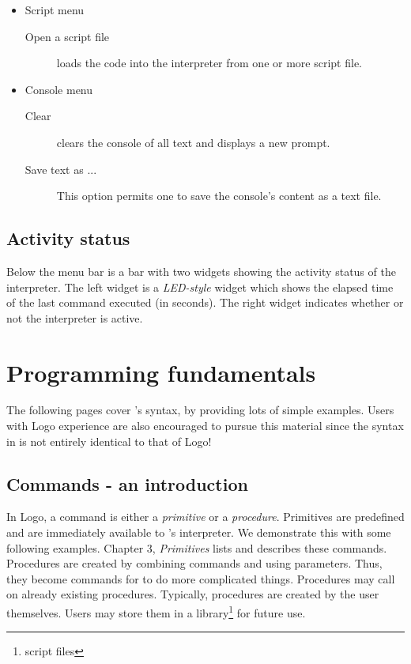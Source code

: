\begin{itemize}
\item Script menu

\begin{description}
\item[Open a script file] loads the code into the interpreter from one or more \squirrel script file.
\end{description}

\item Console menu

\begin{description}
\item[Clear] clears the console of all text and displays a new prompt.
\item[Save text as ...] This option permits one to save the console's content as a text file.
\end{description}
\end{itemize}

\subsection{Activity status}

Below the menu bar is a bar with two widgets showing the activity status of the interpreter. The left widget is a {\em LED-style} widget which shows the elapsed time of the last command executed (in seconds).  The right widget indicates whether or not the interpreter is active.

\section{Programming fundamentals} 

The following pages cover \squirrel's syntax, by providing lots of simple examples.  Users with Logo experience are also encouraged to pursue this material since the syntax in \squirrel is not entirely identical to that of Logo!
  
\subsection{Commands - an introduction} 

In Logo, a command is either a {\em primitive} or a {\em procedure}.  Primitives are predefined and are immediately available to \squirrel's interpreter. We demonstrate this with some following examples.  Chapter 3, {\em Primitives} lists and describes these commands.  Procedures are created by combining commands and using parameters.  Thus, they become commands for \squirrel to do more complicated things.  Procedures may call on already existing procedures.  Typically, procedures are created by the user themselves.  Users may store them in a library\footnote{\squirrel script files} for future use. 
 
